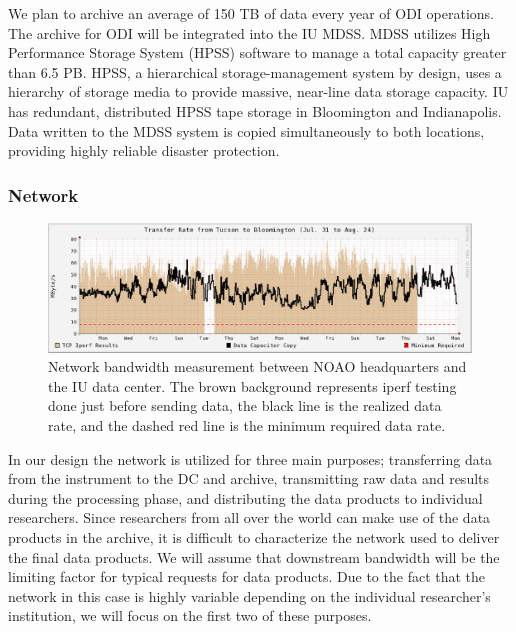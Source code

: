\documentclass[10pt,conference]{IEEEtran}
\begin{document}
We plan to archive an average of 150 TB of data every year of ODI operations. The archive for ODI will be integrated into the IU MDSS. MDSS utilizes High Performance Storage System (HPSS) software to manage a total capacity greater than 6.5 PB. HPSS, a hierarchical storage-management system by design, uses a hierarchy of storage media to provide massive, near-line data storage capacity. IU has redundant, distributed HPSS tape storage in Bloomington and Indianapolis. Data written to the MDSS system is copied simultaneously to both locations, providing highly reliable disaster protection. 

\subsubsection{Network}\label{sec:network}
\begin{figure}[t]
\centering
\includegraphics[width=6in]{network_throughput.eps}
\caption{Network bandwidth measurement between NOAO headquarters and the IU data center. The brown background represents iperf testing done just before sending data, the black line is the realized data rate, and the dashed red line is the minimum required data rate.}
\label{fig:network}
\end{figure}

In our design the network is utilized for three main purposes; transferring data from the instrument to the DC and archive, transmitting raw data and results during the processing phase, and distributing the data products to individual researchers. Since researchers from all over the world can make use of the data products in the archive, it is difficult to characterize the network used to deliver the final data products. We will assume that downstream bandwidth will be the limiting factor for typical requests for data products. Due to the fact that the network in this case is highly variable depending on the individual researcher's institution, we will focus on the first two of these purposes. 
\end{document}
